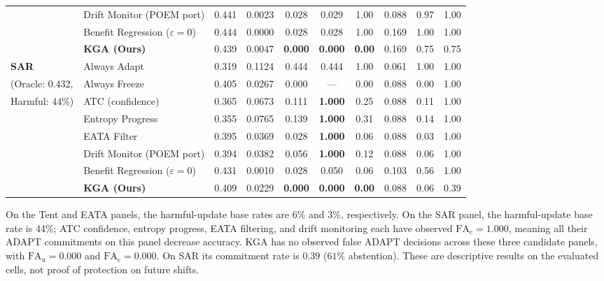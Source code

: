 \begin{table}[t]
{\begin{tabular}{@{}llcccccccc@{}}
& Drift Monitor (POEM port) & 0.441 & 0.0023 & 0.028 & 0.029 & 1.00 & 0.088 & 0.97 & 1.00 \\
& Benefit Regression ($\varepsilon=0$) & 0.444 & 0.0000 & 0.028 & 0.028 & 1.00 & 0.169 & 1.00 & 1.00 \\
& \textbf{KGA (Ours)} & 0.439 & 0.0047 & \textbf{0.000} & \textbf{0.000} & \textbf{0.00} & 0.169 & 0.75 & 0.75 \\
\midrule
\textbf{SAR} & Always Adapt & 0.319 & 0.1124 & 0.444 & 0.444 & 1.00 & 0.061 & 1.00 & 1.00 \\
(Oracle: 0.432, & Always Freeze & 0.405 & 0.0267 & 0.000 & --- & 0.00 & 0.088 & 0.00 & 1.00 \\
Harmful: 44\%) & ATC (confidence) & 0.365 & 0.0673 & 0.111 & \textbf{1.000} & 0.25 & 0.088 & 0.11 & 1.00 \\
& Entropy Progress & 0.355 & 0.0765 & 0.139 & \textbf{1.000} & 0.31 & 0.088 & 0.14 & 1.00 \\
& EATA Filter & 0.395 & 0.0369 & 0.028 & \textbf{1.000} & 0.06 & 0.088 & 0.03 & 1.00 \\
& Drift Monitor (POEM port) & 0.394 & 0.0382 & 0.056 & \textbf{1.000} & 0.12 & 0.088 & 0.06 & 1.00 \\
& Benefit Regression ($\varepsilon=0$) & 0.431 & 0.0010 & 0.028 & 0.050 & 0.06 & 0.103 & 0.56 & 1.00 \\
& \textbf{KGA (Ours)} & 0.409 & 0.0229 & \textbf{0.000} & \textbf{0.000} & \textbf{0.00} & 0.088 & 0.06 & 0.39 \\
\bottomrule
\end{tabular}%
}
\end{table}

On the Tent and EATA panels, the harmful-update base rates are 6\% and 3\%, respectively.
On the SAR panel, the harmful-update base rate is 44\%; ATC confidence, entropy progress,
EATA filtering, and drift monitoring each have observed $\mathrm{FA}_{\mathrm c} = 1.000$,
meaning all their ADAPT commitments on this panel decrease accuracy. KGA has no observed
false ADAPT decisions across these three candidate panels, with $\mathrm{FA}_{\mathrm u} = 0.000$
and $\mathrm{FA}_{\mathrm c} = 0.000$. On SAR its commitment rate is $0.39$ ($61\%$ abstention).
These are descriptive results on the evaluated cells, not proof of protection on future shifts.

